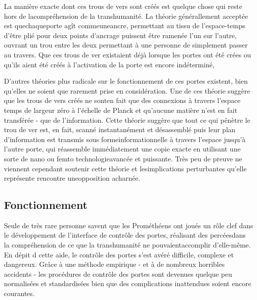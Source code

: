 {La manière exacte dont ces trous de vers sont créés est quelque chose qui reste hors de lacompréhension de la transhumanité. La théorie générallement acceptée est quechaqueporte agît commeuneancre, permettant au tissu de l'espace-temps d'être plié pour deux points d'ancrage puissent être ramenée l'un sur l'autre, ouvrant un trou entre les deux permettant à une personne de simplement passer au travers. Que ces trous de ver existaient déjà lorsque les portes ont été crées ou qu'ils aient été créés à l'activation de la porte est encore indéterminé, 

D'autres théories plus radicale sur le fonctionnement de ces portes existent, bien qu'elles ne soient que rarement prise en considération. Une de ces théorie suggère que les trous de vers créés ne sonten fait que des connexions à travers l'espace temps de largeur zéro à l'échelle de Planck et qu'aucune matière n'est en fait transférée - que de l'information. Cette théorie suggère que tout ce qui pénètre le trou de ver est, en fait, scanné instantanément et désassemblé puis leur plan d'information est transmis sous formeinformationnelle à travers l'espace jusqu'à l'autre porte, qui réassemble immédiatement une copie exacte en utilisant une sorte de nano ou femto technologieavancée et puissante. Très peu de preuve ne viennent cependant soutenir cette théorie et lesimplications perturbantes qu'elle représente rencontre uneopposition acharnée. 

\subsection{Fonctionnement} 

Seule de très rare personne savent que les Prométhéens ont joués un rôle clef dans le développement de l'interface de contrôle des portes, réalisant des percéesdans la compréhension de ce que la transhumanité ne pouvaientaccomplir d'elle-même. En dépit d cette aide, le contrôle des portes s'est avéré difficile, complexe et dangereux. Grâce à une méthode empirique - et à de nombreux horribles accidents - les procédures de contrôle des portes sont devenues quelque peu normalisées et standardisées bien que des complications inattendues soient encore courantes. 

}
